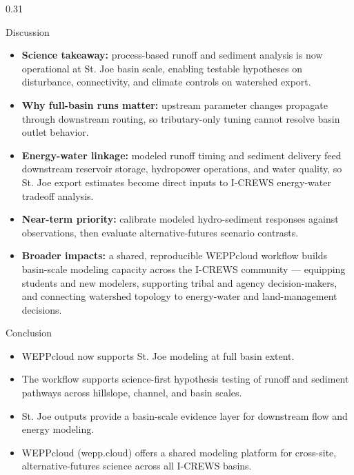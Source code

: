 \documentclass[final]{beamer}
\newlength{\bodyH}\setlength{\bodyH}{69cm}
\newenvironment{pitem}
  {\begin{itemize}\setlength{\itemsep}{0.3em}\setlength{\parskip}{0pt}}
  {\end{itemize}}
\newcommand{\lead}[1]{\textbf{\color{icrewsnavy}#1}}
\begin{document}
\begin{frame}[t]
\begin{columns}[t]
\begin{column}{0.31\textwidth}
\begin{minipage}[t][\bodyH][t]{\linewidth}
  \vfill

  \begin{block}{Discussion}
    \begin{pitem}
      \item \lead{Science takeaway:} process-based runoff and sediment
        analysis is now operational at St. Joe basin scale, enabling
        testable hypotheses on disturbance, connectivity, and climate
        controls on watershed export.
      \item \lead{Why full-basin runs matter:} upstream parameter
        changes propagate through downstream routing, so tributary-only
        tuning cannot resolve basin outlet behavior.
      \item \lead{Energy-water linkage:} modeled runoff timing and
        sediment delivery feed downstream reservoir storage, hydropower
        operations, and water quality, so St. Joe export estimates
        become direct inputs to I-CREWS energy-water tradeoff analysis.
      \item \lead{Near-term priority:} calibrate modeled hydro-sediment
        responses against observations, then evaluate alternative-futures
        scenario contrasts.
      \item \lead{Broader impacts:} a shared, reproducible WEPPcloud
        workflow builds basin-scale modeling capacity across the I-CREWS
        community --- equipping students and new modelers, supporting
        tribal and agency decision-makers, and connecting watershed
        topology to energy-water and land-management decisions.
    \end{pitem}
  \end{block}

  \vfill

  \begin{block}{Conclusion}
    \begin{pitem}
      \item WEPPcloud now supports St. Joe modeling at full basin extent.
      \item The workflow supports science-first hypothesis testing of
        runoff and sediment pathways across hillslope, channel, and
        basin scales.
      \item St. Joe outputs provide a basin-scale evidence layer for
        downstream flow and energy modeling.
      \item WEPPcloud (wepp.cloud) offers a shared modeling platform for
        cross-site, alternative-futures science across all I-CREWS
        basins.
    \end{pitem}
  \end{block}


\end{minipage}
\end{column}
\end{columns}
\end{frame}
\end{document}
